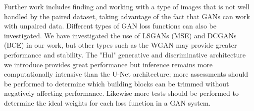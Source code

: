 Further work includes finding and working with a type of images that is not well handled by the paired dataset, taking advantage of the fact that \acp{GAN} can work with unpaired data. Different types of \ac{GAN} loss functions can also be investigated. We have investigated the use of \acp{LSGAN} (\ac{MSE}) and \acp{DCGAN} (\ac{BCE}) in our work, but other types such as the \ac{WGAN} may provide greater performance and stability. The "Hul" generative and discriminative architecture we introduce provides great performance but inference remains more computationally intensive than the U-Net architecture; more assessments should be performed to determine which building blocks can be trimmed without negatively affecting performance. Likewise more tests should be performed to determine the ideal weights for each loss function in a \ac{GAN} system.






